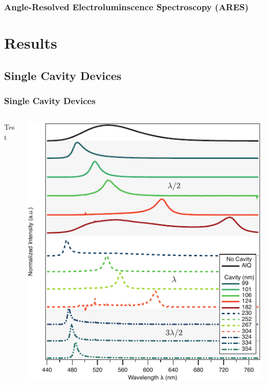 \documentclass{beamer}
\begin{document}
    \begin{frame}
        \frametitle{Angle-Resolved Electroluminscence Spectroscopy (ARES)}
    \end{frame}
    
\section{Results}
    \frame{\tableofcontents[currentsection]}
    
    \subsection{Single Cavity Devices}
        \begin{frame}
            \frametitle{Single Cavity Devices}
            \begin{columns}
                \begin{column}{0.4\textwidth}
					Test
                \end{column}
                \begin{column}{0.6\textwidth}
					\centering
					\includegraphics[width=\textwidth]{images/n1_spectra.png}
                \end{column}
            \end{columns}
        \end{frame}
        
\end{document}
